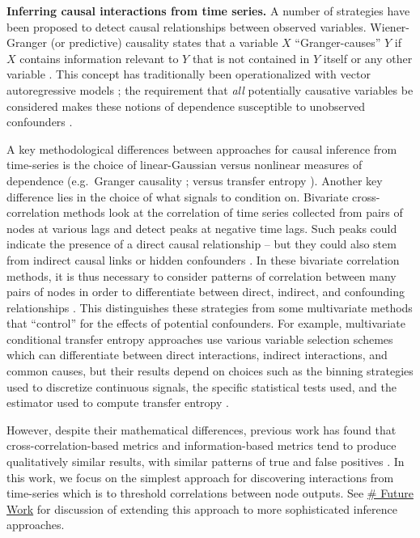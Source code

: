\documentclass{article}
\begin{document}
\textbf{Inferring causal interactions from time series.} A number of strategies have been proposed to detect causal relationships between observed variables. Wiener-Granger (or predictive) causality states that a variable \(X\) ``Granger-causes'' \(Y\) if \(X\) contains information relevant to \(Y\) that is not contained in \(Y\) itself or any other variable \autocite{wiener1956theory}. This concept has traditionally been operationalized with vector autoregressive models
\autocite{granger1969investigating}; the requirement that \emph{all}
potentially causative variables be considered makes these notions of dependence susceptible to unobserved confounders
\autocite{runge2018causal}.

A key methodological differences between approaches for causal inference from time-series is the choice of linear-Gaussian versus nonlinear measures of dependence (e.g.~Granger causality
\textcite{schreiber2000measuring}; \textcite{barnett2009granger} versus transfer entropy \textcite{bossomaier2016transfer}). Another key difference lies in the choice of what signals to condition on. Bivariate cross-correlation methods look at the correlation of time series collected from pairs of nodes at various lags and detect peaks at negative time lags. Such peaks could indicate the presence of a direct causal relationship -- but they could also stem from indirect causal links or hidden confounders \autocite{dean2016dangers}. In these bivariate correlation methods, it is thus necessary to consider patterns of correlation between many pairs of nodes in order to differentiate between direct, indirect, and confounding relationships
\autocite{dean2016dangers}. This distinguishes these strategies from some multivariate methods that ``control'' for the effects of potential confounders. For example, multivariate conditional transfer entropy approaches use various variable selection schemes which can differentiate between direct interactions, indirect interactions, and common causes, but their results depend on choices such as the binning strategies used to discretize continuous signals, the specific statistical tests used, and the estimator used to compute transfer entropy \autocite{wibral2014directed,wollstadt2019idtxl}.

However, despite their mathematical differences, previous work has found that cross-correlation-based metrics and information-based metrics tend to produce qualitatively similar results, with similar patterns of true and false positives \autocite{garofalo2009evaluation}. In this work, we focus on the simplest approach for discovering interactions from time-series which is to threshold correlations between node outputs. See
\href{REF-SECTION-HERE}{\# Future Work} for discussion of extending this approach to more sophisticated inference approaches.
\end{document}
